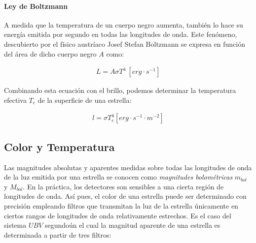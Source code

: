 \documentclass{tufte-handout}
\begin{document}
\paragraph{Ley de Boltzmann}

A medida que la temperatura de un cuerpo negro aumenta, también lo hace su energía emitida por segundo en todas las longitudes de onda. Este fenómeno, descubierto por el físico austríaco Josef Stefan Boltzmann se expresa en función del área de dicho cuerpo negro $A$ como:

\begin{align}
  L = A \sigma T^4 ~ [erg \cdot s^{-1}]
\end{align}

Combinando esta ecuación con el brillo, podemos determinar la temperatura efectiva $T_e$ de la superficie de una estrella:

\begin{align}
  l = \sigma T_e^4 [erg \cdot s^{-1} \cdot m^{-2}]
\end{align}


\subsection{Color y Temperatura}

Las magnitudes absolutas y aparentes medidas sobre todas las longitudes de onda de la luz emitida por una estrella se conocen como \emph{magnitudes bolométricas} $m_{bol}$ y $M_{bol}$. En la práctica, los detectores son sensibles a una cierta región de longitudes de onda. Así pues, el color de una estrella puede ser determinado con precisión empleando filtros que transmitan la luz de la estrella únicamente en ciertos rangos de longitudes de onda relativamente estrechos. Es el caso del sistema $UBV$ segundoún el cual la magnitud aparente de una estrella es determinada a partir de tres filtros:

\end{document}
